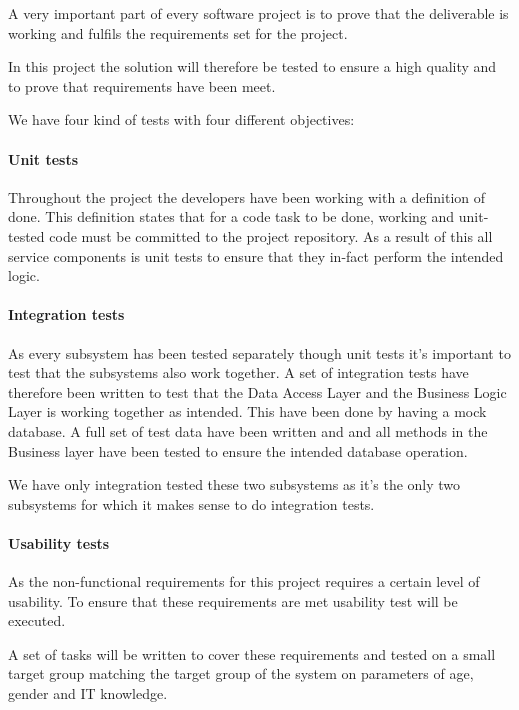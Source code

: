 \documentclass[../report.tex]{subfiles}
\begin{document}
\graphicspath{{img/}{../img/}}

A very important part of every software project is to prove that the deliverable is working and fulfils the requirements set for the project.

In this project the solution will therefore be tested to ensure a high quality and to prove that requirements have been meet.


We have four kind of tests with four different objectives:



\paragraph{Unit tests}

Throughout the project the developers have been working with a definition of done. This definition states that for a code task to be done, working and unit-tested code must be committed to the project repository. As a result of this all service components is unit tests to ensure that they in-fact perform the intended logic.

\paragraph{Integration tests}

As every subsystem has been tested separately though unit tests it's important to test that the subsystems also work together. A set of integration tests have therefore been written to test that the Data Access Layer and the Business Logic Layer is working together as intended. This have been done by having a mock database. A full set of test data have been written and and all methods in the Business layer have been tested to ensure the intended database operation.

We have only integration tested these two subsystems as it's the only two subsystems for which it makes sense to do integration tests. 

\paragraph{Usability tests}

As the non-functional requirements for this project requires a certain level of usability. To ensure that these requirements are met usability test will be executed.

A set of tasks will be written to cover these requirements and tested on a small target group matching the target group of the system on parameters of age, gender and IT knowledge.
\end{document}
